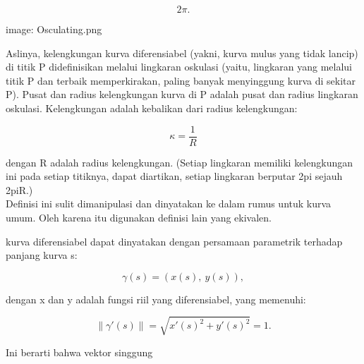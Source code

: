 \documentclass[a4paper,10pt]{article}
\begin{document}
\begin{eulernotebook}
\begin{eulercomment}
\begin{eulercomment}
\begin{eulercomment}
\begin{eulercomment}
\begin{eulercomment}
\begin{eulercomment}
\begin{eulercomment}
\begin{eulercomment}
\begin{eulercomment}
\begin{eulercomment}
\begin{eulercomment}
\begin{eulercomment}
\begin{eulercomment}
\begin{eulercomment}
\begin{eulercomment}
\end{eulercomment}
\begin{eulerformula}
\[
2\pi.
\]
\end{eulerformula}
\begin{eulercomment}
image: Osculating.png

Aslinya, kelengkungan kurva diferensiabel (yakni, kurva mulus yang
tidak lancip) di titik P didefinisikan melalui lingkaran oskulasi
(yaitu, lingkaran yang melalui titik P dan terbaik memperkirakan,
paling banyak menyinggung kurva di sekitar P). Pusat dan radius
kelengkungan kurva di P adalah pusat dan radius lingkaran oskulasi.
Kelengkungan adalah kebalikan dari radius kelengkungan:

\end{eulercomment}
\begin{eulerformula}
\[
\kappa =\frac {1}{R}
\]
\end{eulerformula}
\begin{eulercomment}
dengan R adalah radius kelengkungan. (Setiap lingkaran memiliki
kelengkungan ini pada setiap titiknya, dapat diartikan, setiap
lingkaran berputar 2pi sejauh 2piR.)\\
Definisi ini sulit dimanipulasi dan dinyatakan ke dalam rumus untuk
kurva umum. Oleh karena itu digunakan definisi lain yang ekivalen.

\end{eulercomment}
\begin{eulercomment}
kurva diferensiabel dapat dinyatakan dengan persamaan parametrik
terhadap panjang kurva s:

\end{eulercomment}
\begin{eulerformula}
\[
\gamma(s) = (x(s),\ y(s)),
\]
\end{eulerformula}
\begin{eulercomment}
dengan x dan y adalah fungsi riil yang diferensiabel, yang memenuhi:

\end{eulercomment}
\begin{eulerformula}
\[
\|\gamma'(s)\|=\sqrt{x'(s)^2+y'(s)^2}=1.
\]
\end{eulerformula}
\begin{eulercomment}
Ini berarti bahwa vektor singgung



\end{eulercomment}
\end{eulercomment}
\end{eulercomment}
\end{eulercomment}
\end{eulercomment}
\end{eulercomment}
\end{eulercomment}
\end{eulercomment}
\end{eulercomment}
\end{eulercomment}
\end{eulercomment}
\end{eulercomment}
\end{eulercomment}
\end{eulercomment}
\end{eulercomment}
\end{eulernotebook}
\end{document}
